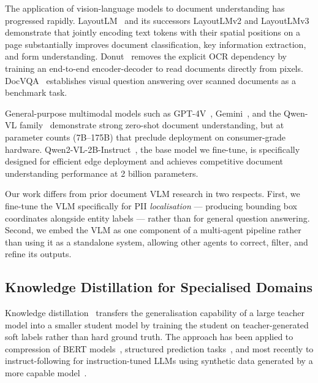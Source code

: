 \documentclass[conference]{IEEEtran}
\begin{document}
The application of vision-language models to document
understanding has progressed rapidly.
LayoutLM~\cite{xu2020layoutlm} and its successors
LayoutLMv2 and LayoutLMv3~\cite{xu2021layoutlmv2,
huang2022layoutlmv3} demonstrate that jointly encoding
text tokens with their spatial positions on a page
substantially improves document classification, key
information extraction, and form understanding.
Donut~\cite{kim2022donut} removes the explicit OCR
dependency by training an end-to-end encoder-decoder
to read documents directly from pixels.
DocVQA~\cite{mathew2021docvqa} establishes visual
question answering over scanned documents as a
benchmark task.

General-purpose multimodal models such as
GPT-4V~\cite{openai2023gpt4v},
Gemini~\cite{team2023gemini}, and the Qwen-VL
family~\cite{bai2023qwenvl} demonstrate strong
zero-shot document understanding,
but at parameter counts (7B--175B) that preclude
deployment on consumer-grade hardware.
Qwen2-VL-2B-Instruct~\cite{wang2024qwen2vl}, the base
model we fine-tune, is specifically designed for
efficient edge deployment and achieves competitive
document understanding performance at 2 billion
parameters.

Our work differs from prior document VLM research in
two respects.
First, we fine-tune the VLM specifically for PII
\emph{localisation} --- producing bounding box coordinates
alongside entity labels --- rather than for general
question answering.
Second, we embed the VLM as one component of a
multi-agent pipeline rather than using it as a
standalone system, allowing other agents to correct,
filter, and refine its outputs.

\subsection{Knowledge Distillation for Specialised Domains}

Knowledge distillation~\cite{hinton2015distilling}
transfers the generalisation capability of a large
teacher model into a smaller student model by training
the student on teacher-generated soft labels rather
than hard ground truth.
The approach has been applied to compression of BERT
models~\cite{sanh2019distilbert}, structured prediction
tasks~\cite{li2022explaining}, and most recently to
instruct-following for instruction-tuned LLMs using
synthetic data generated by a more capable
model~\cite{taori2023alpaca, wang2023selfinstruct}.
\end{document}
